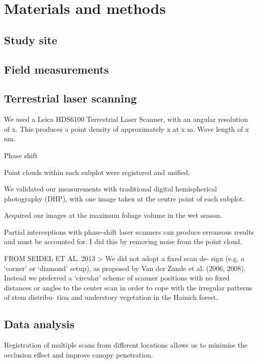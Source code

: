 \documentclass[11pt,a4paper]{article}
\begin{document}
\section{Materials and methods}

\subsection{Study site}

\subsection{Field measurements}

\subsection{Terrestrial laser scanning}

We used a Leica HDS6100 Terrestrial Laser Scanner, with an angular resolution of
x. This produces a point density of approximately x at x m. Wave length of x nm.

Phase shift

Point clouds within each subplot were registered and unified.

We validated our measurements with traditional digital hemispherical photography
(DHP), with one image taken at the centre point of each subplot.

Acquired our images at the maximum foliage volume in the wet season.

Partial interceptions with phase-shift laser scanners can produce erroneous results and must be accounted for. I did this by removing noise from the point cloud.

FROM SEIDEL ET AL. 2013 > We did not adopt a fixed scan de- sign (e.g. a ‘corner’ or ‘diamond’ setup), as proposed by Van der Zande et al. (2006, 2008). Instead we preferred a ‘circular’ scheme of scanner positions with no fixed distances or angles to the center scan in order to cope with the irregular patterns of stem distribu- tion and understory vegetation in the Hainich forest.

\subsection{Data analysis}

Registration of multiple scans from different locations allows us to minimise
the occlusion effect and improve canopy penetration.
\end{document}
